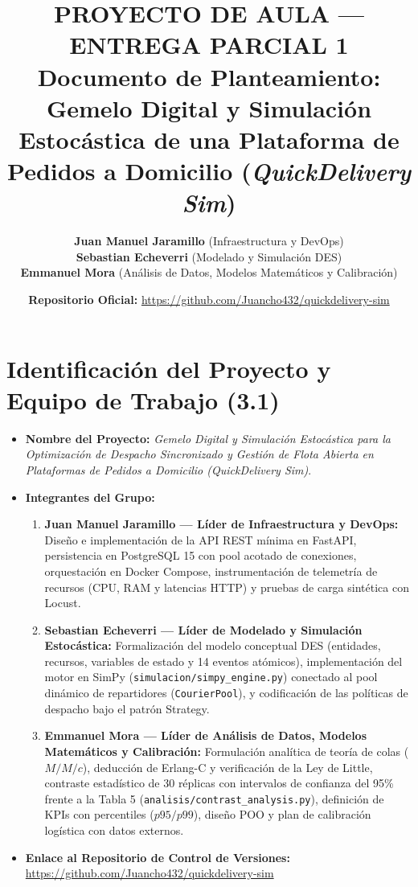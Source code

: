 \documentclass[11pt,letterpaper]{article}
\title{\textbf{\Large PROYECTO DE AULA — ENTREGA PARCIAL 1}\\[0.3em]
\textbf{\large Documento de Planteamiento: Gemelo Digital y Simulación Estocástica de una Plataforma de Pedidos a Domicilio (\textit{QuickDelivery Sim})}}
\author{\textbf{Juan Manuel Jaramillo} (Infraestructura y DevOps) \\
\textbf{Sebastian Echeverri} (Modelado y Simulación DES) \\
\textbf{Emmanuel Mora} (Análisis de Datos, Modelos Matemáticos y Calibración)}
\date{\textbf{Repositorio Oficial:} \url{https://github.com/Juancho432/quickdelivery-sim}}
\begin{document}
\maketitle

\section{Identificación del Proyecto y Equipo de Trabajo (3.1)}

\begin{itemize}[leftmargin=1.5em, itemsep=0.3em]
    \item \textbf{Nombre del Proyecto:} \textit{Gemelo Digital y Simulación Estocástica para la Optimización de Despacho Sincronizado y Gestión de Flota Abierta en Plataformas de Pedidos a Domicilio (QuickDelivery Sim)}.
    \item \textbf{Integrantes del Grupo:}
    \begin{enumerate}[leftmargin=1.2em, itemsep=0.2em]
        \item \textbf{Juan Manuel Jaramillo — Líder de Infraestructura y DevOps:} Diseño e implementación de la API REST mínima en FastAPI, persistencia en PostgreSQL 15 con pool acotado de conexiones, orquestación en Docker Compose, instrumentación de telemetría de recursos (CPU, RAM y latencias HTTP) y pruebas de carga sintética con Locust.
        \item \textbf{Sebastian Echeverri — Líder de Modelado y Simulación Estocástica:} Formalización del modelo conceptual DES (entidades, recursos, variables de estado y 14 eventos atómicos), implementación del motor en SimPy (\texttt{simulacion/simpy\_engine.py}) conectado al pool dinámico de repartidores (\texttt{CourierPool}), y codificación de las políticas de despacho bajo el patrón Strategy.
        \item \textbf{Emmanuel Mora — Líder de Análisis de Datos, Modelos Matemáticos y Calibración:} Formulación analítica de teoría de colas ($M/M/c$), deducción de Erlang-C y verificación de la Ley de Little, contraste estadístico de 30 réplicas con intervalos de confianza del 95\% frente a la Tabla 5 (\texttt{analisis/contrast\_analysis.py}), definición de KPIs con percentiles ($p95/p99$), diseño POO y plan de calibración logística con datos externos.
    \end{enumerate}
    \item \textbf{Enlace al Repositorio de Control de Versiones:} \url{https://github.com/Juancho432/quickdelivery-sim}
\end{itemize}
\end{document}
